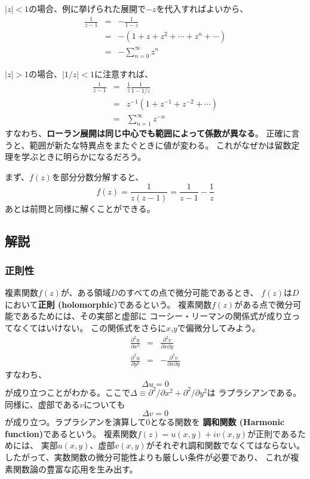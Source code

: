
$|z|<1$の場合、例に挙げられた展開で$-z$を代入すればよいから、
\begin{eqnarray}
  \frac{1}{z-1} &=& - \frac{1}{1-z}\\
  &=& -(1 + z + z^2 + \cdots + z^n + \cdots) \\
  &=& -\sum_{n=0}^{\infty} z^n
\end{eqnarray}

$|z|>1$の場合、$|1/z|<1$に注意すれば、
\begin{eqnarray}
  \frac{1}{z-1} &=& \frac{1}{z} \frac{1}{1 - 1/z}\\
  &=& z^{-1}
  \left(
  1 + z^{-1}+ z^{-2}+ \cdots
  \right)\\
  &=& \sum_{n=1}^{\infty} z^{-n}
\end{eqnarray}
すなわち、{\bf ローラン展開は同じ中心でも範囲によって係数が異なる}。
正確に言うと、範囲が新たな特異点をまたぐときに値が変わる。
これがなぜかは留数定理を学ぶときに明らかになるだろう。

まず、$f(z)$を部分分数分解すると、
\begin{equation}
  f(z) = \frac{1}{z(z-1)} = \frac{1}{z-1} - \frac{1}{z}
\end{equation}
あとは前問と同様に解くことができる。

\subsection{解説}

\subsubsection{正則性}
複素関数$f(z)$が、ある領域$D$のすべての点で微分可能であるとき、
$f(z)$は$D$において{\bf 正則 (holomorphic)}であるという。
複素関数$f(z)$がある点で微分可能であるためには、その実部と虚部に
コーシー・リーマンの関係式が成り立ってなくてはいけない。
この関係式をさらに$x$,$y$で偏微分してみよう。
\begin{eqnarray}
  \frac{\partial^2 u}{\partial x^2} &=& \frac{\partial^2 v}{\partial x \partial y}\\
  \frac{\partial^2 u}{\partial y^2} &=& - \frac{\partial^2 v}{\partial x \partial y}
\end{eqnarray}
すなわち、
\begin{equation}
  \Delta u = 0
\end{equation}
が成り立つことがわかる。ここで$\Delta \equiv \partial^2/\partial x^2 + \partial^2/\partial y^2$は
ラプラシアンである。
同様に、虚部である$v$についても
\begin{equation}
  \Delta v = 0
\end{equation}
が成り立つ。ラプラシアンを演算して0となる関数を
{\bf 調和関数 (Harmonic function)}であるという。
複素関数$f(z)= u(x,y) + i v(x,y)$が正則であるためには、
実部$u(x,y)$、虚部$v(x,y)$がそれぞれ調和関数でなくてはならない。
したがって、実数関数の微分可能性よりも厳しい条件が必要であり、
これが複素関数論の豊富な応用を生み出す。

